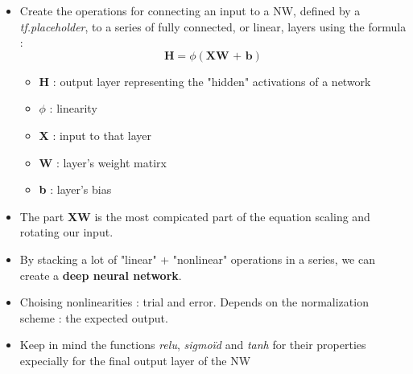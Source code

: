 \documentclass[12pt,a4paper]{article}
\begin{document}
\begin{itemize}
\item Create the operations for connecting an input to a NW, defined by a \textit{tf.placeholder}, to a series of fully connected, or linear, layers using the formula :
\begin{equation}
\textbf{H} = \phi(\textbf{XW + b})
\end{equation}
\begin{itemize}
\item \textbf{H} : output layer representing the "hidden" activations of a network
\item $\phi$ : linearity
\item \textbf{X} : input to that layer
\item \textbf{W} : layer's weight matirx
\item \textbf{b} : layer's bias
\end{itemize}
\item The part \textbf{XW} is the most compicated part of the equation scaling and rotating our input.
\item By stacking a lot of "linear" + "nonlinear" operations in a series, we can create a \textbf{deep neural network}.
\item Choising nonlinearities : trial and error. Depends on the normalization scheme : the expected output.
\item Keep in mind the functions \textit{relu}, \textit{sigmoïd} and \textit{tanh} for their properties expecially for the final output layer of the NW

\end{itemize}
\end{document}
